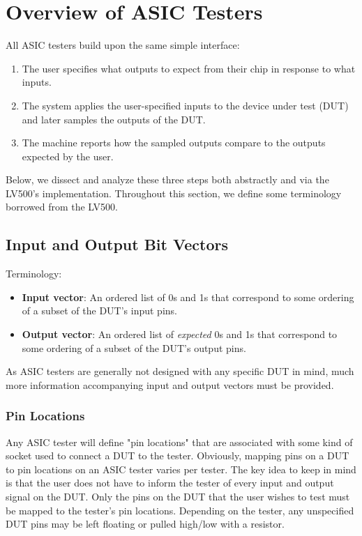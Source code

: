 \section{Overview of ASIC Testers}
All ASIC testers build upon the same simple interface: 
\begin{enumerate}
\item The user specifies what outputs to expect from their chip in response to what inputs.
\item The system applies the user-specified inputs to the device under test (DUT) and later samples the outputs of the DUT.
\item The machine reports how the sampled outputs compare to the outputs expected by the user.
\end{enumerate}

Below, we dissect and analyze these three steps both abstractly and via the LV500's implementation. Throughout this section, we define some terminology borrowed from the LV500. 

\subsection{Input and Output Bit Vectors}
Terminology: 
\begin{itemize}
\item \textbf{Input vector}: An ordered list of 0s and 1s that correspond to some ordering of a subset of the DUT's input pins. 
\item \textbf{Output vector}: An ordered list of \textit{expected} 0s and 1s that correspond to some ordering of a subset of the DUT's output pins. 
\end{itemize}

As ASIC testers are generally not designed with any specific DUT in mind, much more information accompanying input and output vectors must be provided.

\subsubsection{Pin Locations}
Any ASIC tester will define "pin locations" that are associated with some kind of socket used to connect a DUT to the tester. Obviously, mapping pins on a DUT to pin locations on an ASIC tester varies per tester. The key idea to keep in mind is that the user does not have to inform the tester of every input and output signal on the DUT. Only the pins on the DUT that the user wishes to test must be mapped to the tester's pin locations. Depending on the tester, any unspecified DUT pins may be left floating or pulled high/low with a resistor.

